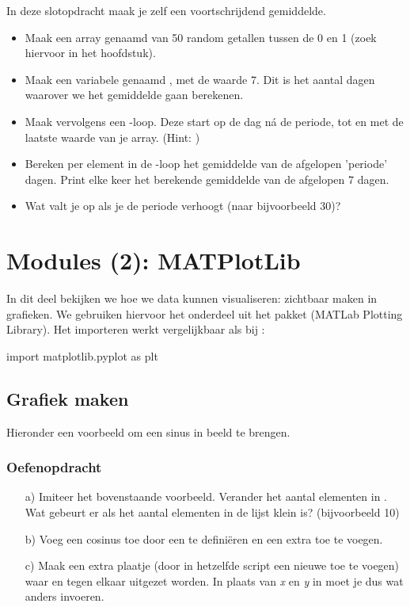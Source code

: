 \documentclass[a4paper,11pt, fleqn]{article}
\newcommand{\ditwc}{Naam van het huidige werkcollege}
\begin{document}
In deze slotopdracht maak je zelf een voortschrijdend gemiddelde.

\begin{itemize}
	\item Maak een array genaamd  van 50 random getallen tussen de 0 en 1 (zoek hiervoor in het hoofdstuk).
	\item Maak een variabele genaamd , met de waarde 7. Dit is het aantal dagen waarover we het gemiddelde gaan berekenen.
	\item Maak vervolgens een -loop. Deze start op de dag n\'a de periode, tot en met de laatste waarde van je array. (Hint: )
	\item Bereken per element in de -loop het gemiddelde van de afgelopen 'periode' dagen. Print elke keer het berekende gemiddelde van de afgelopen 7 dagen.
	\item Wat valt je op als je de periode verhoogt (naar bijvoorbeeld 30)?
\end{itemize}

\clearpage
\renewcommand{\ditwc}{Modules(2): MATPlotLib}
\section{Modules (2): MATPlotLib}
In dit deel bekijken we hoe we data kunnen visualiseren: zichtbaar maken in grafieken. We gebruiken hiervoor het  onderdeel uit het pakket  (MATLab Plotting Library). Het importeren werkt vergelijkbaar als bij :
\begin{python}
import matplotlib.pyplot as plt
\end{python}

\subsection{Grafiek maken}
Hieronder een voorbeeld om een sinus in beeld te brengen.

\subsubsection*{Oefenopdracht}
\begin{itemize}
	\item[a)] Imiteer het bovenstaande voorbeeld. Verander het aantal elementen in . Wat gebeurt er als het aantal elementen in de lijst klein is? (bijvoorbeeld 10)

	\item[b)] Voeg een cosinus toe door een  te defini\"eren en een extra  toe te voegen. 

	\item[c)] Maak een extra plaatje (door in hetzelfde script een nieuwe  toe te voegen) waar  en  tegen elkaar uitgezet worden. In plaats van \textit{x} en \textit{y} in  moet je dus wat anders invoeren.
\end{itemize}
\end{document}
